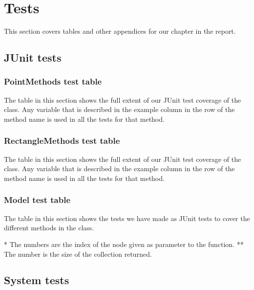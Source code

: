 \appendix
\addappheadtotoc
\chapter{Tests}
This section covers tables and other appendices for our  chapter in
the report.
\section{JUnit tests}
\label{APP-TE-JU}
\subsection{PointMethods test table}
\label{APP-TE-JU-PM}
The table in this section shows the full extent of our JUnit test coverage of
the  class. Any variable that is described in the
example column in the row of the method name is used in all the tests for that
method.



\subsection{RectangleMethods test table}
\label{APP-TE-JU-RM}
The table in this section shows the full extent of our JUnit test coverage of
the  class. Any variable that is described in the
example column in the row of the method name is used in all the tests for that
method.



\subsection{Model test table}
\label{APP-TE-JU-MO}
The table in this section shows the tests we have made as JUnit tests to cover
the different methods in the  class.


 
*  The numbers are the index of the node given as parameter to the function.
** The number is the size of the collection returned.
\section{System tests}
\label{APP-TE-ST}



